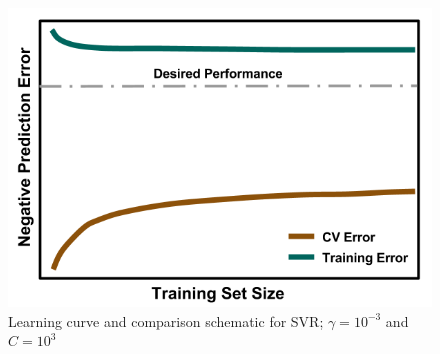 \begin{frame}
\begin{figure}
\begin{minipage}{0.35\textwidth}
      \includegraphics[width=\linewidth]{./figures/NegLearningCurve-variance.png}
    \end{minipage}
    \caption{Learning curve and comparison schematic for SVR; $\gamma=10^{-3}$ and $C=10^3$}
  \end{figure}
\end{frame}


